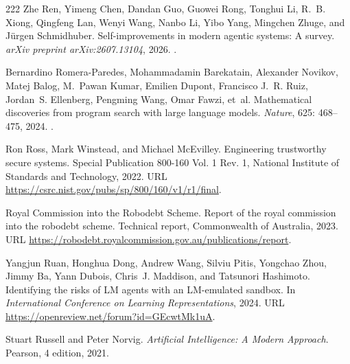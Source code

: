 \begin{thebibliography}{222}
Zhe Ren, Yimeng Chen, Dandan Guo, Guowei Rong, Tonghui Li, R.~B. Xiong,
  Qingfeng Lan, Wenyi Wang, Nanbo Li, Yibo Yang, Mingchen Zhuge, and J{\"u}rgen
  Schmidhuber.
\newblock Self-improvements in modern agentic systems: A survey.
\newblock \emph{arXiv preprint arXiv:2607.13104}, 2026.
\newblock {}.

Bernardino Romera-Paredes, Mohammadamin Barekatain, Alexander Novikov, Matej
  Balog, M.~Pawan Kumar, Emilien Dupont, Francisco J.~R. Ruiz, Jordan~S.
  Ellenberg, Pengming Wang, Omar Fawzi, et~al.
\newblock Mathematical discoveries from program search with large language
  models.
\newblock \emph{Nature}, 625: 468--475, 2024.
\newblock {}.

Ron Ross, Mark Winstead, and Michael McEvilley.
\newblock Engineering trustworthy secure systems.
\newblock Special Publication 800-160 Vol. 1 Rev. 1, National Institute of
  Standards and Technology, 2022.
\newblock URL \url{https://csrc.nist.gov/pubs/sp/800/160/v1/r1/final}.

{Royal Commission into the Robodebt Scheme}.
\newblock Report of the royal commission into the robodebt scheme.
\newblock Technical report, Commonwealth of Australia, 2023.
\newblock URL
  \url{https://robodebt.royalcommission.gov.au/publications/report}.

Yangjun Ruan, Honghua Dong, Andrew Wang, Silviu Pitis, Yongchao Zhou, Jimmy Ba,
  Yann Dubois, Chris~J. Maddison, and Tatsunori Hashimoto.
\newblock Identifying the risks of {LM} agents with an {LM}-emulated sandbox.
\newblock In \emph{International Conference on Learning Representations}, 2024.
\newblock URL \url{https://openreview.net/forum?id=GEcwtMk1uA}.

Stuart Russell and Peter Norvig.
\newblock \emph{Artificial Intelligence: A Modern Approach}.
\newblock Pearson, 4 edition, 2021.


\end{thebibliography}

